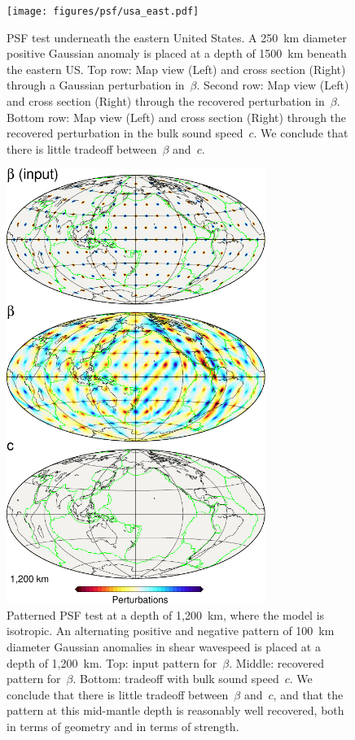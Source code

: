 \documentclass[extra,mreferee]{gji}
\begin{document}
\begin{figure}
  \centering
  \texttt{[image: figures/psf/usa\_east.pdf]}
  \caption{\small{PSF test underneath the eastern United States.
    A 250~km diameter positive Gaussian anomaly is placed at a depth of 1500~km beneath the eastern US.
  Top row: Map view (Left) and cross section (Right) through a Gaussian perturbation in~$\beta$.
  Second row: Map view (Left) and cross section (Right) through the recovered perturbation in~$\beta$.
  Bottom row: Map view (Left) and cross section (Right) through the recovered perturbation in the bulk sound speed~$c$. We conclude that there is little tradeoff between~$\beta$ and~$c$.
  }}
  \label{fig:psf_usa_east}
\end{figure}

\begin{figure}
  \centering
  \includegraphics[width=0.75\textwidth]{figures/psf/psf-1200km.pdf}
  \caption{\small{Patterned PSF test at a depth of 1,200~km,
  where the model is isotropic.
    An alternating positive and negative pattern of 100~km diameter Gaussian anomalies in shear wavespeed is placed at a depth of 1,200~km.
  Top: input pattern for~$\beta$.
  Middle: recovered pattern for~$\beta$.
  Bottom: tradeoff with bulk sound speed~$c$.
  We conclude that there is little tradeoff between~$\beta$ and~$c$, and that the pattern at this mid-mantle depth is reasonably well recovered, both in terms of geometry and in terms of strength.
  }}
  \label{fig:patern1200}
\end{figure}
\end{document}
